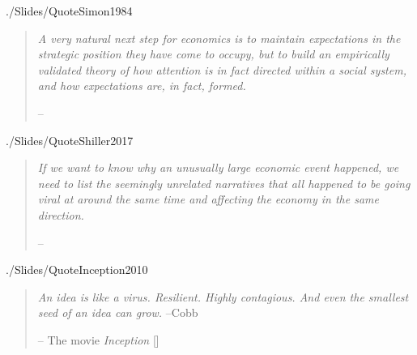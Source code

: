   \begin{verbatimwrite}{./Slides/QuoteSimon1984}%
    \begin{quote}
      \textit{A very natural next step for economics is to maintain expectations in	the strategic position they have come to occupy, but to build an empirically validated theory of how attention is in fact directed within a social system, and how expectations are, in fact, formed.}

      \medskip
      \indent -- \href{https://econpapers.repec.org/RePEc:eee:jeborg:v:5:y:1984:i:1:p:35-55}{\cite{simon_behavioral_1984}}
    \end{quote}
  \end{verbatimwrite} %

  \begin{verbatimwrite}{./Slides/QuoteShiller2017}%
    \begin{quote}
      \textit{If we want to know why an unusually large economic event happened, we need to list the seemingly unrelated narratives that all happened to be going viral at around the same time and affecting the economy in the same direction.}

      \medskip
      \indent -- \href{https://www.amazon.in/Narrative-Economics-Stories-Economic-Events-ebook/dp/B07RRDVTHY}{\cite{shiller2017narrative}}
    \end{quote}
  \end{verbatimwrite} %

  \begin{verbatimwrite}{./Slides/QuoteInception2010}%
    \begin{quote}
      \textit{An idea is like a virus. Resilient. Highly contagious. And even the smallest seed of an idea can grow.}   --Cobb

      \medskip \indent --
      The movie \textit{Inception} [\citeyear{Inception2010}]
    \end{quote}
  \end{verbatimwrite} %


